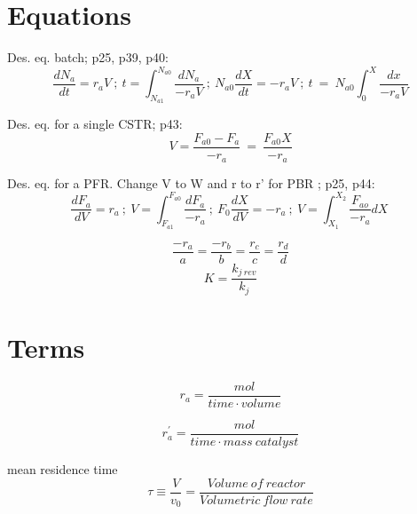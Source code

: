 \documentclass[8pt]{article}
\begin{document}
\twocolumn

\section*{Equations}

Des. eq. batch; p25, p39, p40: 
\[ \frac{dN_{a}}{dt}=r_{a}V \ ; \ t=\int_{N_{a1}}^{N_{a0}}\frac{dN_{a}}{-r_{a}V} \ ; \ N_{a0}\frac{dX}{dt}=-r_{a}V \ ; \ t\ =\ N_{a0}\int_{0}^{X}\frac{dx}{-r_{a}V}  \]

Des. eq. for a single CSTR; p43:
\[ V=\frac{F_{a0}-F_{a}}{-r_{a}} \ =\ \frac{F_{a0}X}{-r_{a}}  \]

 Des. eq. for a PFR. Change V to W and r to r' for PBR ; p25, p44:
\[ \frac{dF_{a}}{dV}=r_{a} \ ; \  V=\int_{F_{a1}}^{F_{a0}}\frac{dF_{a}}{-r_{a}} \ ; \ F_{0}\frac{dX}{dV}=-r_{a} \ ;  \ V=\int_{X_1}^{X_2}\frac{F_{ao}}{-r_{a}}dX  \  \]



\[ \frac{-r_{a}}{a}=\frac{-r_{b}}{b}=\frac{r_{c}}{c}=\frac{r_{d}}{d} \]
\[ K=\frac{k_{j\ rev}}{k_{j}} \]













\clearpage
\section*{Terms}

\[ r_{a} =  \frac{mol}{time \cdot volume}  \label{rate} \tag{p6} \]




\[ r_{a}^{'}=\frac{mol}{time\cdot mass\ catalyst} \tag{p6} \]

mean residence time 
\[ \tau \equiv \frac{V}{v_0}  = \frac{ Volume \ of \ reactor }{ Volumetric \ flow \ rate} \]
\end{document}
